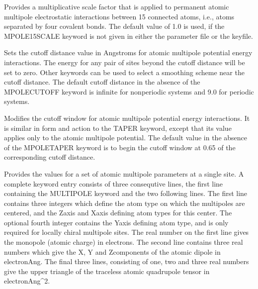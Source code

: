 \documentclass[letterpaper,11pt,english]{sphinxmanual}
\begin{document}
  Provides a multiplicative scale factor that is applied to permanent atomic multipole  electrostatic interactions between 1\sphinxhyphen{}5 connected atoms, i.e., atoms separated by four covalent bonds. The default value of 1.0 is used, if the MPOLE\sphinxhyphen{}15\sphinxhyphen{}SCALE keyword is not given in either the parameter file or the keyfile.

  Sets the cutoff distance value in Angstroms for atomic multipole potential energy interactions. The energy for any pair of sites beyond the cutoff distance will be set to zero. Other keywords can be used to select a smoothing scheme near the cutoff distance. The default cutoff distance in the absence of the MPOLE\sphinxhyphen{}CUTOFF keyword is infinite for nonperiodic systems and 9.0 for periodic systems.


  Modifies the cutoff window for atomic multipole potential energy interactions. It is similar in form and action to the TAPER keyword, except that its value applies only to the atomic multipole potential. The default value in the absence of the MPOLE\sphinxhyphen{}TAPER keyword is to begin the cutoff window at 0.65 of the corresponding cutoff distance.

  Provides the values for a set of atomic multipole parameters at a single site. A complete keyword entry consists of three consequtive lines, the first line containing the MULTIPOLE keyword and the two following lines. The first line contains three integers which define the atom type on which the multipoles are centered, and the Z\sphinxhyphen{}axis and X\sphinxhyphen{}axis defining atom types for this center. The optional fourth integer contains the Y\sphinxhyphen{}axis defining atom type, and is only required for locally chiral multipole sites. The real number on the first line gives the monopole (atomic charge) in electrons. The second line contains three real numbers which give the X\sphinxhyphen{}, Y\sphinxhyphen{} and Z\sphinxhyphen{}components of the atomic dipole in electron\sphinxhyphen{}Ang. The final three lines, consisting of one, two and three real numbers give the upper triangle of the traceless atomic quadrupole tensor in electron\sphinxhyphen{}Ang\textasciicircum{}2.
\end{document}
